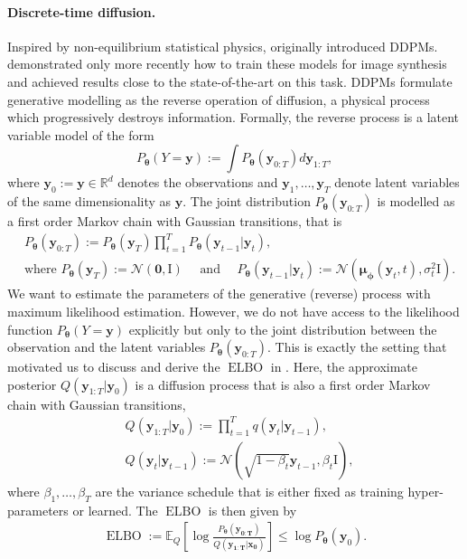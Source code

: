 \paragraph{Discrete-time diffusion.}
Inspired by non-equilibrium statistical physics, \citet{sohl-dickstein_deep_2015} originally introduced DDPMs. \citet{ho_denoising_2020}  demonstrated only more recently how to train these models for image synthesis and achieved results close to the state-of-the-art on this task.
DDPMs formulate generative modelling as the reverse operation of diffusion, a physical process which progressively destroys information.
Formally, the reverse process is a latent variable model of the form
$$P_{\bm{\theta}}(Y=\mathbf{y}) := \int P_{\bm{\theta}}(\mathbf{y}_{0:T}) d\mathbf{y}_{1:T},$$
where $\mathbf{y}_0:=\mathbf{y} \in \mathbb{R}^d$ denotes the observations and $\mathbf{y}_1, \dots, \mathbf{y}_T$ denote latent variables of the same dimensionality as $\mathbf{y}$. The joint distribution $P_{\bm{\theta}}(\mathbf{y}_{0:T})$ is modelled as a first order Markov chain with Gaussian transitions, that is
\begin{align}
    &P_{\bm{\theta}}(\mathbf{y}_{0:T}) := P_{\bm{\theta}}(\mathbf{y}_{T}) \prod^T_{t=1} P_{\bm{\theta}}(\mathbf{y}_{t-1}|\mathbf{y}_{t}),\\
    & \text{where } P_{\bm{\theta}}(\mathbf{y}_{T}) := \mathcal{N}(\mathbf{0}, \text{I}) \quad \text{ and } \quad P_{\bm{\theta}}(\mathbf{y}_{t-1}|\mathbf{y}_{t}) := \mathcal{N}(\mathbf{\mu_\phi}(\mathbf{y}_t, t), \sigma_t^2 \text{I}).
\end{align}
We want to estimate the parameters of the generative (reverse) process with maximum likelihood estimation. However, we do not have access to the likelihood function $P_{\bm{\theta}}(Y=\mathbf{y})$ explicitly but only to the joint distribution between the observation and the latent variables $P_{\bm{\theta}}(\mathbf{y}_{0:T})$. This is exactly the setting that motivated us to discuss and derive the $\operatorname{ELBO}$ in .
Here, the approximate posterior $Q(\mathbf{y}_{1:T}|\mathbf{y}_0)$ is a diffusion process that is also a first order Markov chain with Gaussian transitions,
\begin{align}
    &Q(\mathbf{y}_{1:T}|\mathbf{y}_0) := \prod^T_{t=1} q(\mathbf{y}_{t}|\mathbf{y}_{t-1}),\\
    &Q(\mathbf{y}_{t}|\mathbf{y}_{t-1}) := \mathcal{N}(\sqrt{1-\beta_t} \mathbf{y}_{t-1}, \beta_t \text{I}),
\end{align}
where $\beta_1, \hdots, \beta_T$ are the variance schedule that is either fixed as training hyper-parameters or learned.
The $\operatorname{ELBO}$ is then given by
\begin{align}
    \operatorname{ELBO} := \mathbb{E}_Q\left[ \log \frac{P_{\bm{\theta}}(\mathbf{y_{0:T}})}{Q(\mathbf{y_{1:T}}|\mathbf{x_0})} \right] \leq \log P_{\bm{\theta}}(\mathbf{y}_0). \label{eq:ELBO_DDPM}
\end{align}

